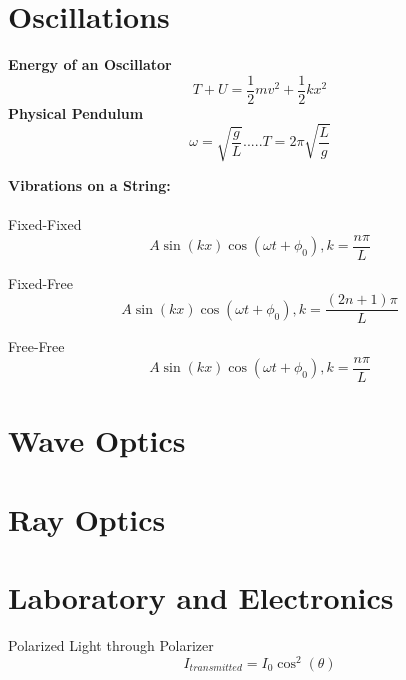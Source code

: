 \documentclass{article}
\begin{document}
\section{Oscillations}
{\bf{Energy of an Oscillator}}\begin{equation}T+U=\frac{1}{2}mv^2 + \frac{1}{2}kx^2\end{equation}
{\bf{Physical Pendulum}}\begin{equation}\omega = \sqrt{\frac{g}{L}}.....T=2\pi \sqrt{\frac{L}{g}}\end{equation}

{\bf{Vibrations on a String:}}\\
\\
\hspace*{.5in}Fixed-Fixed\begin{equation}A\sin(kx)\cos(\omega t + \phi_0), k = \frac{n\pi}{L}\end{equation}

\hspace*{.5in}Fixed-Free\begin{equation}A\sin(kx)\cos(\omega t+\phi_0), k = \frac{(2n+1)\pi}{L}\end{equation}

\hspace*{.5in}Free-Free\begin{equation}A\sin(kx)\cos(\omega t + \phi_0), k= \frac{n\pi}{L}\end{equation}


\section{Wave Optics}










\section{Ray Optics}









\section{Laboratory and Electronics}
Polarized Light through Polarizer\begin{equation}I_{transmitted} = I_0\cos^2(\theta)\end{equation}
\end{document}
